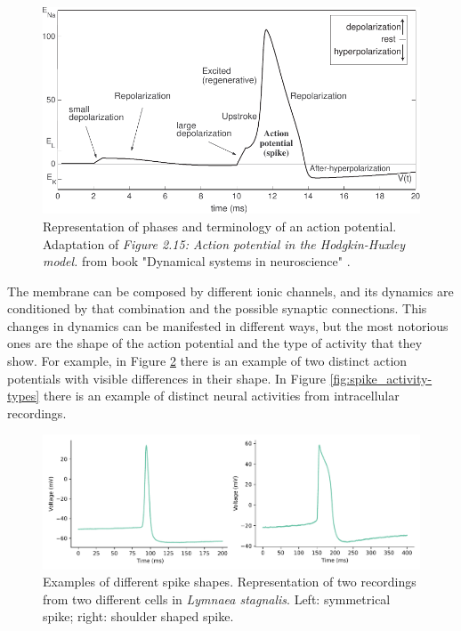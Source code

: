 \begin{figure}[htb!]
    \centering
    \includegraphics[width=\linewidth]{img/intro/dns_spike_phases.pdf}
    \caption{Representation of phases and terminology of an action potential. Adaptation of \textit{Figure 2.15: Action potential in the Hodgkin-Huxley model.} from book "Dynamical systems in neuroscience" \parencite{izhikevich_dynamical_2007}. }
    \label{fig:action potential}
\end{figure}
The membrane can be composed by different ionic channels, and its dynamics are conditioned by that combination and the possible synaptic connections. This changes in dynamics can be manifested in different ways, but the most notorious ones are the shape of the action potential and the type of activity that they show. %
For example, in Figure \ref{fig:spike-types} there is an example of two distinct action potentials with visible differences in their shape. In Figure \ref{fig:spike_activity-types} there is an example of distinct neural activities from intracellular recordings. 
\begin{figure}[htb!]
    \centering
    \includegraphics[width=\linewidth]{img/intro/spike-types.pdf}
    \caption{Examples of different spike shapes. Representation of two recordings from two different cells in \textit{Lymnaea stagnalis}. Left: symmetrical spike; right: shoulder shaped spike.}
    \label{fig:spike-types}
\end{figure}

